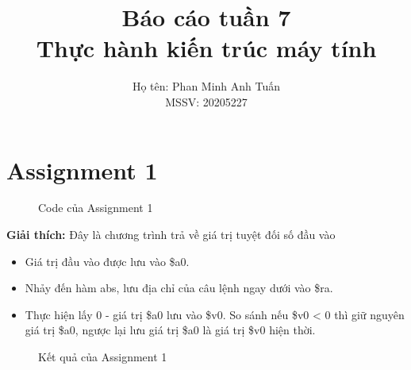 \documentclass[a4paper,12pt]{article}
\title{\textbf{Báo cáo tuần 7 \\ Thực hành kiến trúc máy tính}}
\author{Họ tên: Phan Minh Anh Tuấn \\ MSSV: 20205227}
\date{}
\begin{document}
\maketitle
\tableofcontents
\newpage
\section{Assignment 1}
\begin{figure}[!h]
	\centerline{}
	\caption{Code của Assignment 1}
	\label{fig:ass1}
	\noindent
\end{figure}
\noindent
\textbf{Giải thích: }Đây là chương trình trả về giá trị tuyệt đối số đầu vào
\begin{itemize}
	\item Giá trị đầu vào được lưu vào \$a0.
	\item Nhảy đến hàm abs, lưu địa chỉ của câu lệnh ngay dưới vào \$ra.
	\item Thực hiện lấy 0 - giá trị \$a0 lưu vào \$v0. So sánh nếu \$v0 < 0 thì giữ nguyên giá trị \$a0, ngược lại lưu giá trị \$a0 là giá trị \$v0 hiện thời.
\end{itemize}
\clearpage
\begin{figure}[t!]
	\centerline{}
	\caption{Kết quả của Assignment 1}
	\label{fig:ass1_kq}
	\noindent
\end{figure}
\clearpage
\end{document}
